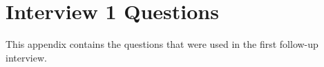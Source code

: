 
\chapter{Interview 1 Questions} %

\label{AppendixB} %


This appendix contains the questions that were used in the first follow-up interview.

